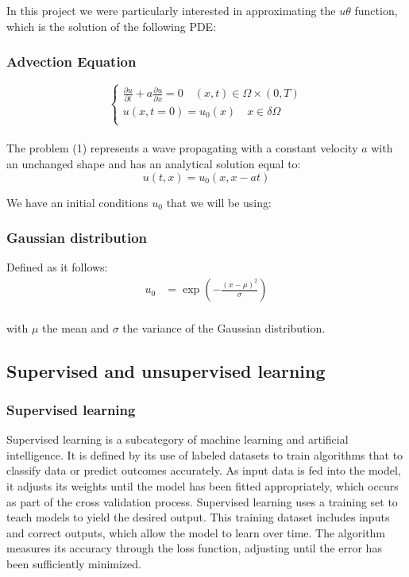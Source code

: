 \documentclass{article}
\begin{document}
In this project we were particularly interested in approximating the $u\theta$ function, which is the solution of the following PDE:

\subsubsection*{Advection Equation}

\begin{equation}
    \begin{cases}
    \frac{\partial u}{\partial t} + a \frac{\partial u}{\partial x} = 0 \quad (x,t) \in \Omega \times (0,T) \\
     u(x,t=0) = u_0(x) \quad x \in \delta \Omega \\
    \end{cases}
\end{equation}
\\
The problem (1) represents a wave propagating with a constant velocity $a$ with an unchanged shape and has an analytical solution equal to: 
$$
u(t, x)=u_0(x, x-at)
$$

We have an initial conditions $u_0$ that we will be using:  
\subsubsection*{Gaussian distribution}

Defined as it follows:
\begin{align*}
    u_0 &= \exp\left(-\frac{(x - \mu)^2}{\sigma}\right)
\end{align*}
\\
with $\mu$ the mean and $\sigma$ the variance of the Gaussian distribution.

\subsection{Supervised and unsupervised learning}

\subsubsection{Supervised learning}

Supervised learning is a subcategory of machine learning and artificial intelligence. 
It is defined by its use of labeled datasets to train algorithms that to classify data or predict outcomes accurately. As input data is fed into the model, 
it adjusts its weights until the model has been fitted appropriately, which occurs as part of the cross validation process. Supervised learning uses a training set to teach models to yield the desired output. This training dataset includes inputs and correct outputs, which allow the model to learn over time. The algorithm measures its accuracy through the loss function, 
adjusting until the error has been sufficiently minimized. 
\end{document}
